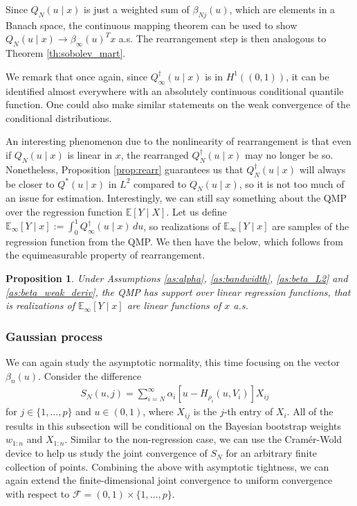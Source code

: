 \documentclass[11pt,a4paper]{article}
\newtheorem{proposition}{Proposition}%
\newenvironment{proof_outline}{\begin{proof}[Proof outline]}{\end{proof}}
\newcommand{\E}{\mathbb{E}}
\begin{document}
\begin{proof_outline}
Since $Q_N(u \mid x)$ is just a weighted sum of $\beta_{Nj}(u)$, which are elements in a Banach space, the continuous mapping theorem can be used to show $Q_N(u \mid x) \to \beta_\infty(u)^T x$ a.s. The rearrangement step is then analogous to {Theorem \ref{th:sobolev_mart}}. 
\end{proof_outline}
We remark that once again, since $Q_\infty^{\dagger}(u \mid x)$ is in $H^1((0,1))$, it can be identified almost everywhere with an absolutely continuous conditional quantile function. One could also make similar statements on the weak convergence of the conditional distributions. 

An interesting phenomenon due to the nonlinearity of rearrangement is that even if $Q_N(u \mid x)$ is linear in $x$, the rearranged $Q_N^{\dagger}(u \mid x)$ may no longer be so. Nonetheless, {Proposition \ref{prop:rearr}} guarantees us that $Q_N^{\dagger}(u \mid x)$ will always be closer to $Q^*(u \mid x)$ in $L^2$ compared to $Q_N(u \mid x)$, so it is not too much of an issue for estimation. Interestingly, we can still say something about the QMP over the regression function $\E[Y \mid X]$. Let us define $\E_\infty[Y \mid x] := \int_0^1 Q_\infty^{\dagger}(u \mid x) \, du$, so realizations of $\E_\infty[Y \mid x]$ are samples of the regression function from the QMP. We then have the below, which follows from the equimeasurable property of rearrangement.
\begin{proposition}\label{prop:linear}
  Under {Assumptions \ref{as:alpha}}, {\ref{as:bandwidth}},  {\ref{as:beta_L2}} and  {\ref{as:beta_weak_deriv}}, the QMP has support over linear regression functions, that is realizations of $\E_\infty[Y \mid x]$ are linear functions of $x$ a.s.
\end{proposition}

\subsubsection{Gaussian process}
We can again study the asymptotic normality, this time focusing on the vector $\beta_{n}(u)$. Consider the difference
\begin{align*}
    S_{N}(u,j) = \sum_{i=N}^\infty\alpha_{i}\left[u -H_{\rho_{i}}\left(u,V_{i}\right)\right]X_{ij}\quad 
\end{align*}
for $j \in \{1,\ldots,p\}$ and $u \in (0,1)$,
where $X_{ij}$ is the $j$-th entry of $X_{i}$. All of the results in this subsection will be conditional on the Bayesian bootstrap weights $w_{1:n}$ and $X_{1:n}$. Similar to the non-regression case, we can use the Cram\'{e}r-Wold device to help us study the joint convergence of $S_{N}$ for an arbitrary finite collection of points.
Combining the above with asymptotic tightness, we can again extend the finite-dimensional joint convergence to uniform convergence with respect to $\mathcal{F} = (0,1) \times \{1,\ldots, p\}$.
\end{document}

